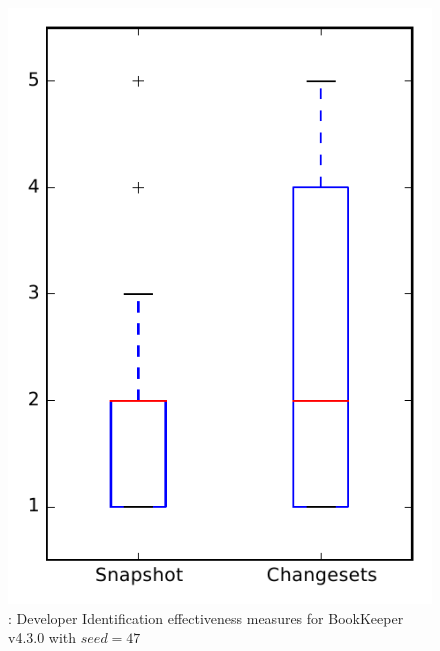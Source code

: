 
\begin{figure}
\centering
\includegraphics[height=0.4\textheight]{figures/dit_seed/rq1_bookkeeper_47}
\caption{\rtwo: Developer Identification effectiveness measures for BookKeeper v4.3.0 with $seed=47$}
\label{fig:dit_seed:rq1:bookkeeper}
\end{figure}
